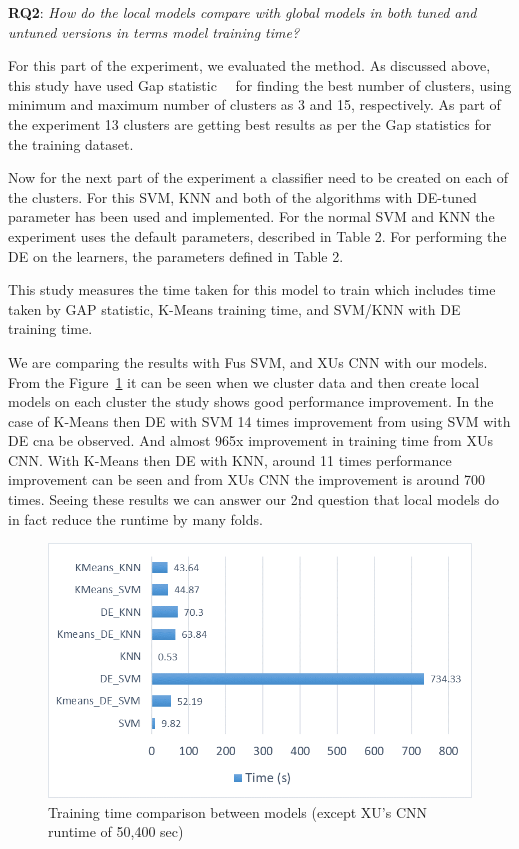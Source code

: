 \documentclass[sigconf]{acmart}
\theoremstyle{break}
\begin{document}
    \textbf{RQ2}: {\em  How do the local models compare with global models in both tuned and untuned versions in terms model training time?}
    
    For this part of the experiment, we evaluated the method. As discussed above, this study have used Gap statistic~\cite{mohajer2011comparison}~\cite{tibshirani2001estimating} for finding the best number of clusters, using minimum and maximum number of clusters as 3 and 15, respectively. As part of the experiment 13 clusters are getting best results as per the Gap statistics for the training dataset. 
    
    Now for the next part of the experiment a classifier need to be created on each of the clusters. For this SVM, KNN and both of the algorithms with DE-tuned parameter has been used and implemented. For the normal SVM and KNN the experiment uses the default parameters, described in Table 2. For performing the DE on the learners, the parameters defined in Table 2. 
    
    This study measures the time taken for this model to train which includes time taken by GAP statistic, K-Means training time, and SVM/KNN with DE training time.
    
    We are comparing the results with Fu\textquotesingle s SVM, and XU\textquotesingle s CNN with our models. From the Figure~\ref{fig:time} it can be seen when we cluster data and then create local models on each cluster the study shows good performance improvement. In the case of K-Means then DE with SVM 14 times improvement from using SVM with DE cna be observed. And almost 965x improvement in training time from XU\textquotesingle s CNN. With K-Means then DE with KNN, around 11 times performance improvement can be seen and from XU\textquotesingle s CNN the improvement is around 700 times. Seeing these results we can answer our 2nd question that local models do in fact reduce the runtime by many folds.
    
    \begin{figure}
        \centering
        \includegraphics[width=\linewidth]{fig/Time.png}
        \caption{Training time comparison between models (except XU's CNN runtime of 50,400 sec)}
        \label{fig:time}
    \end{figure}
    
\end{document}
